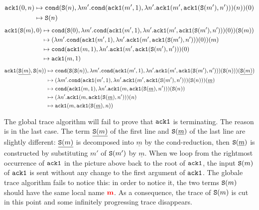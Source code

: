 \begin{align*}
  {\tt ack1}(0,n)
  &\mapsto
  {\tt cond}({\tt S}(n),\lambda m'.{\tt cond}({\tt ack1}(m',1),\lambda n'.{\tt ack1}(m',{\tt ack1}({\tt S}(m'),n')))(n))(0)
  \\
  &\mapsto
  {\tt S}(n)
\end{align*}
\begin{align*}
  {\tt ack1}({\tt S}(m),0)
  &\mapsto
  {\tt cond}({\tt S}(0),\lambda m'.{\tt cond}({\tt ack1}(m',1),\lambda n'.{\tt ack1}(m',{\tt ack1}({\tt S}(m'),n')))(0))({\tt S}(m))
  \\
  &\mapsto
  (\lambda m'.{\tt cond}({\tt ack1}(m',1),\lambda n'.{\tt ack1}(m',{\tt ack1}({\tt S}(m'),n')))(0))(m)
  \\
  &\mapsto
  {\tt cond}({\tt ack1}(m,1),\lambda n'.{\tt ack1}(m',{\tt ack1}({\tt S}(m'),n')))(0)
  \\
  &\mapsto
  {\tt ack1}(m,1)
\end{align*}
\begin{align*}
  {\tt ack1}(\underline{{\tt S}(m)},{\tt S}(n))
  &\mapsto
  {\tt cond}({\tt S}({\tt S}(n)),\lambda m'.{\tt cond}({\tt ack1}(m',1),\lambda n'.{\tt ack1}(m',{\tt ack1}({\tt S}(m'),n')))({\tt S}(n)))(\underline{{\tt S}(m)})
  \\
  &\mapsto
  (\lambda m'.{\tt cond}({\tt ack1}(m',1),\lambda n'.{\tt ack1}(m',{\tt ack1}({\tt S}(m'),n')))({\tt S}(n)))(\underline{m})
  \\
  &\mapsto
  {\tt cond}({\tt ack1}(m,1),\lambda n'.{\tt ack1}(m,{\tt ack1}({\tt S}(\underline{m}),n')))({\tt S}(n))
  \\
  &\mapsto
  (\lambda n'.{\tt ack1}(m,{\tt ack1}({\tt S}(\underline{m}),n')))(n)
  \\
  &\mapsto
  {\tt ack1}(m,{\tt ack1}({\tt S}(\underline{m}),n))
\end{align*}


The global trace algorithm will fail to prove that ${\tt ack1}$ is terminating. The reason is in the last case. 
The term $\underline{{\tt S}(m)}$ of the first line and ${\tt S}(\underline{m})$ of the last line are slightly 
different: $\underline{{\tt S}(m)}$ is decomposed into $\underline{m}$ by the $\text{cond}$-reduction, 
then ${\tt S}(\underline{m})$ is constructed by substituting $m'$ of ${\tt S}(m')$ by $\underline{m}$. 
When we loop from the rightmost occurrence of ${\tt ack1}$ 
in the picture above back to the root of ${\tt ack1}$, the input ${\tt S}(m)$ of ${\tt ack1}$ is sent without any change to the first argument of ${\tt ack1}$. The globale trace algorithm fails to notice this: 
in order to notice it, the two terms ${\tt S}(m)$ should have the same local name ${{\bf \color{red}{m}}}$.
As a consequence, the trace of ${\tt S}(m)$ is cut in this point and some infinitely progressing trace
disappears.



